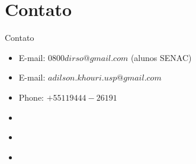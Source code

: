 \section*{Contato}

\begin{frame}	
	\begin{block}{Contato}	
		\begin{itemize}
			\item E-mail:  $0800dirso@gmail.com$ (alunos SENAC)			
			\item E-mail:  $adilson.khouri.usp@gmail.com$
			\item Phone: $+55 11 9444-26191$
			\item \href{https://www.linkedin.com/in/adilson-khouri-51893918/}{\color{blue}{Linkedin}}
			\item \href{http://lattes.cnpq.br/2654721135214993}{\color{blue}{Lattes}}
			\item \href{https://github.com/khouri/Apresentacao_Cusco}{\color{blue}{GitHub}}
		\end{itemize}
	\end{block}
\end{frame}

